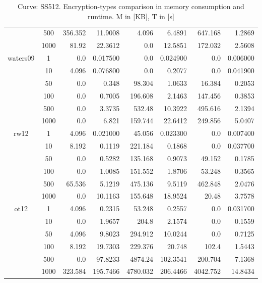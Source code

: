 \documentclass[twoside,11pt,titlepage,a4paper,english,bibliography=totocnumbered,listof=numbered]{scrbook}
\begin{document}
\begin{table}[ht]
{\begin{tabular}{|c|c|r|r|r|r|r|r|}
&500&  356.352    &   11.9008   &    4.096    &    6.4891   &  647.168    &    1.2869    \\
&1000&   81.92     &   22.3612   &    0.0      &   12.5851   &  172.032    &    2.5608    \\
\hline
\multirow{6}{*}{waters09} &1&    0.0      &    0.017500 &    0.0      &    0.024900 &    0.0      &    0.006000  \\
&10&    4.096    &    0.076800 &    0.0      &    0.2077   &    0.0      &    0.041900  \\
&50&    0.0      &    0.348    &   98.304    &    1.0633   &   16.384    &    0.2053    \\
&100&    0.0      &    0.7005   &  196.608    &    2.1463   &  147.456    &    0.3853    \\
&500&    0.0      &    3.3735   &  532.48     &   10.3922   &  495.616    &    2.1394    \\
&1000&    0.0      &    6.821    &  159.744    &   22.6412   &  249.856    &    5.0407    \\
\hline
\multirow{6}{*}{rw12} &1&    4.096    &    0.021000 &   45.056    &    0.023300 &    0.0      &    0.007400  \\
&10&    8.192    &    0.1119   &  221.184    &    0.1868   &    0.0      &    0.037700  \\
&50&    0.0      &    0.5282   &  135.168    &    0.9073   &   49.152    &    0.1785    \\
&100&    0.0      &    1.0085   &  151.552    &    1.8706   &   53.248    &    0.3565    \\
&500&   65.536    &    5.1219   &  475.136    &    9.5119   &  462.848    &    2.0476    \\
&1000&    0.0      &   10.1163   &  155.648    &   18.9524   &   20.48     &    3.7578    \\
\hline
\multirow{6}{*}{ot12} &1&    4.096    &    0.2315   &   53.248    &    0.2557   &    0.0      &    0.031700  \\
&10&    0.0      &    1.9657   &  204.8      &    2.1574   &    0.0      &    0.1559    \\
&50&    4.096    &    9.8023   &  294.912    &   10.0244   &    0.0      &    0.7125    \\
&100&    8.192    &   19.7303   &  229.376    &   20.748    &  102.4      &    1.5443    \\
&500&    0.0      &   97.8233   & 4874.24     &  102.3541   &  200.704    &    7.1368    \\
&1000&  323.584    &  195.7466   & 4780.032    &  206.4466   & 4042.752    &   14.8434    \\
\hline
\end{tabular}}\caption{Curve: SS512. Encryption-types comparison in memory consumption and runtime. M in [KB], T in [s]}\label{table:abe_mem_run_SS512} \end{table} 
\end{document}
